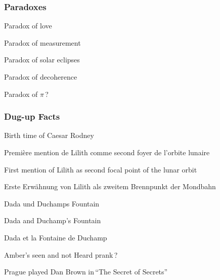 \subsubsection*{Paradoxes}
\begin{list}{}{\setlength{\leftmargin}{13pt}}
\item[\ipdfen] Paradox of love
\vspace{-1.0mm}
\item[\ipdfen] Paradox of measurement
\vspace{-1.0mm}
\item[\ipdfen] Paradox of solar eclipses
\vspace{-1.4mm}
\item[\ipdfen] Paradox of decoherence
\vspace{-1.0mm}
\item[\ipdfen] Paradox of $\pi$\,?
\end{list}

\subsubsection*{Dug-up Facts}
\begin{list}{}{\setlength{\leftmargin}{13pt}}
\item[\ipdfen] Birth time of Caesar Rodney
%
\item[\ipdffr] Première mention de Lilith\newline
comme second foyer de l’orbite lunaire
\vspace{-1.4mm}
\item[\ipdfen] First mention of Lilith\newline
as second focal point of the lunar orbit
\vspace{-1.4mm}
\item[\ipdfde] Erste Erwähnung von Lilith\newline
als zweitem Brennpunkt der Mondbahn
%
\item[\ipdfde] Dada und Duchamps Fountain
\vspace{-1.4mm}
\item[\ipdfen] Dada and Duchamp’s Fountain
\vspace{-1.4mm}
\item[\ipdffr] Dada et la Fontaine de Duchamp
%
\item[\ipdfen] Amber’s seen and not Heard prank\,?
%
\item[\ipdfblueen] {\color{odyssey}Prague \hspace{-0.05em}played \hspace{-0.05em}Dan \hspace{-0.05em}Brown \hspace{-0.05em}in\,“The \hspace{-0.05em}Secret \hspace{-0.05em}of \hspace{-0.05em}Secrets”}
\end{list}

